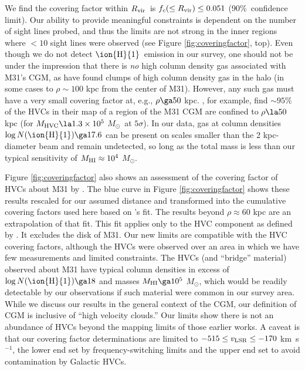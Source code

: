 \documentclass[12pt,preprint]{aastex6}
\newcommand{\virialCovering}{0.051}
\newcommand{\HI}{\ensuremath{\mbox{\ion{H}{1}}}}
\newcommand{\logNHI}{\ensuremath{\log N(\mbox{\ion{H}{1}})}\relax}
\newcommand{\Rvir}{\ensuremath{R_{\rm vir}}\relax}
\newcommand{\msun}{\ensuremath{M_\odot}\relax}
\newcommand{\kms}{km~s$^{-1}$}
\newcommand{\vlsr}{\ensuremath{v_{\rm LSR}\relax}}
\begin{document}
We find the covering factor within \Rvir\ is
$f_c(\le \Rvir) \le \virialCovering$ (90\%\ confidence limit). Our
ability to provide meaningful constraints is dependent on the number
of sight lines probed, and thus the limits are not strong in the inner
regions where $<10$ sight lines were observed (see Figure
\ref{fig:coveringfactor}, top).  Even though we do not detect \HI\
emission in our survey, one should not be under the impression that
there is {\em no} high column density gas associated with M31's CGM,
as \citet{wolfe2016, kerp2016, westmeier2005, westmeier2008} have
found clumps of high column density gas in the halo (in some cases to
$\rho\sim100$ kpc from the center of M31). However, any such gas must
have a very small covering factor at, e.g., $\rho \ga 50$
kpc. \citet{westmeier2008}, for example, find $\sim95\%$ of the HVCs
in their map of a region of the M31 CGM are confined to $\rho \la 50$
kpc (for $M_{\rm HVC} \la 1.3\times10^5$ \msun\ at $5\sigma$). In our
data, gas at column densities $\logNHI \ga 17.6$ can be present on
scales smaller than the 2 kpc-diameter beam and remain undetected, so
long as the total mass is less than our typical sensitivity of
$M_{\rm HI} \approx 10^4$ \msun.

Figure \ref{fig:coveringfactor} also shows an assessment of the
covering factor of HVCs about M31 by \cite{richter2012} \citep[based
on the maps of][]{thilker2004}. The blue curve in Figure
\ref{fig:coveringfactor} shows these results rescaled for our assumed
distance and transformed into the cumulative covering factors used
here based on \citeauthor{richter2012}'s fit. The results beyond
$\rho \approx 60$ kpc are an extrapolation of that fit. This fit
applies only to the HVC component as defined by \cite{thilker2004}. It
excludes the disk of M31. Our new limits are compatible with the HVC
covering factors, although the HVCs were observed over an area in
which we have few measurements and limited constraints. The HVCs (and
``bridge'' material) observed about M31 have typical column densities
in excess of $\logNHI \ga 18$ and masses $M_{\rm HI} \ga 10^5$ \msun,
which would be readily detectable by our observations if such material
were common in our survey area.  While we discuss our results in the
general context of the CGM, our definition of CGM is inclusive of
``high velocity clouds.'' Our limits show there is not an abundance of
HVCs beyond the mapping limits of those earlier works. A caveat is
that our covering factor determinations are limited to
$-515 \le \vlsr \le -170$ \kms, the lower end set by
frequency-switching limits and the upper end set to avoid
contamination by Galactic HVCs.
\end{document}
